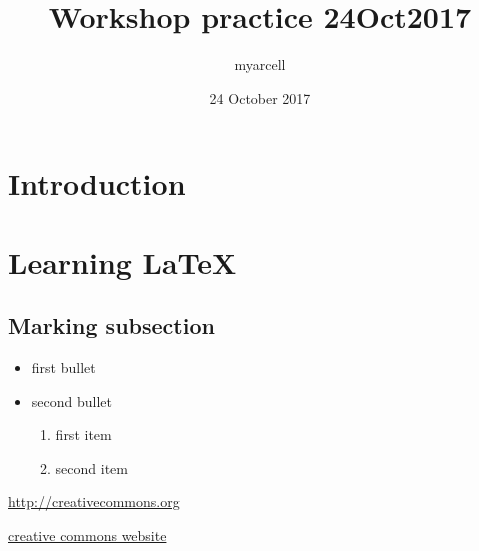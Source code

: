 \documentclass{article}
\title{Workshop practice 24Oct2017}
\author{myarcell }
\date{24 October 2017}
\begin{document}
\maketitle

\section{Introduction}

\section{Learning LaTeX}

\subsection{Marking subsection}

\begin{itemize}
    \item first bullet
    \item second bullet
    
    \begin{enumerate}
        \item first item
        \item second item
        
    \end{enumerate}
\end{itemize}


\url{http://creativecommons.org}

\href{http://creativecommons.org}{creative commons website}
\end{document}
